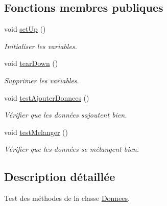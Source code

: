 \subsection*{Fonctions membres publiques}
\begin{DoxyCompactItemize}
\item 
\mbox{\label{class_test_donnees_a270d63fc0fd8310b6981225d31ccb3c5}} 
void \hyperlink{class_test_donnees_a270d63fc0fd8310b6981225d31ccb3c5}{set\+Up} ()
\begin{DoxyCompactList}\small\item\em Initialiser les variables. \end{DoxyCompactList}\item 
\mbox{\label{class_test_donnees_a19fa2b873fc882353606723ba99793c5}} 
void \hyperlink{class_test_donnees_a19fa2b873fc882353606723ba99793c5}{tear\+Down} ()
\begin{DoxyCompactList}\small\item\em Supprimer les variables. \end{DoxyCompactList}\item 
\mbox{\label{class_test_donnees_ab85dfa38fe0efc026b0c2e23b568f659}} 
void \hyperlink{class_test_donnees_ab85dfa38fe0efc026b0c2e23b568f659}{test\+Ajouter\+Donnees} ()
\begin{DoxyCompactList}\small\item\em Vérifier que les données s\textquotesingle{}ajoutent bien. \end{DoxyCompactList}\item 
\mbox{\label{class_test_donnees_a937d740393691c65aac44da6ae6a10f4}} 
void \hyperlink{class_test_donnees_a937d740393691c65aac44da6ae6a10f4}{test\+Melanger} ()
\begin{DoxyCompactList}\small\item\em Vérifier que les données se mélangent bien. \end{DoxyCompactList}\end{DoxyCompactItemize}


\subsection{Description détaillée}
Test des méthodes de la classe \hyperlink{class_donnees}{Donnees}. 

